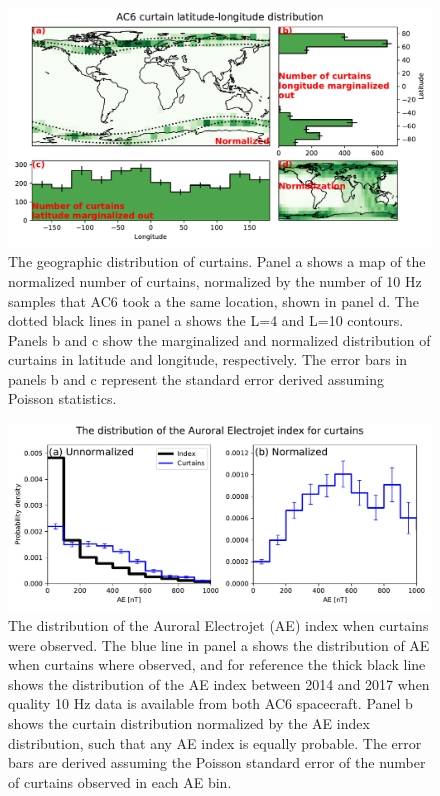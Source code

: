 \documentclass[draft]{agujournal2019}
\begin{document}
\begin{figure}
\includegraphics[width=\textwidth]{curtain_lat_lon.pdf}
\caption{The geographic distribution of curtains. Panel a shows a map of the normalized number of curtains, normalized by the number of 10 Hz samples that AC6 took a the same location, shown in panel d. The dotted black lines in panel a shows the L=4 and L=10 contours. Panels b and c show the marginalized and normalized distribution of curtains in latitude and longitude, respectively. The error bars in panels b and c represent the standard error derived assuming Poisson statistics.}
\label{curtain_lat_lon}
\end{figure}

\begin{figure}
\includegraphics[width=\textwidth]{fig4.pdf}
\caption{The distribution of the Auroral Electrojet (AE) index when curtains were observed. The blue line in panel a shows the distribution of AE when curtains where observed, and for reference the thick black line shows the distribution of the AE index between 2014 and 2017 when quality 10 Hz data is available from both AC6 spacecraft. Panel b shows the curtain distribution normalized by the AE index distribution, such that any AE index is equally probable. The error bars are derived assuming the Poisson standard error of the number of curtains observed in each AE bin.}
\label{ae_dist}
\end{figure}
\end{document}
